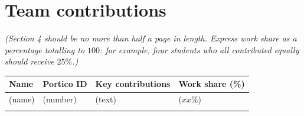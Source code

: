 \documentclass[12pt]{article}
\begin{document}
\section{Team contributions}
\emph{(Section 4 should be no more than half a page in length. Express work share as a percentage totalling to $100$: for example, four students who all contributed equally should receive $25\%$.)}


\vspace{1cm}

\begin{tabular}{|l|l|l|l|}
\hline
{\bf Name} & {\bf Portico ID} & {\bf Key contributions} & {\bf Work share (\%)} \\[1mm]
\hline
(name)    &  (number)  & (text) & ($xx\%$) \\\hline
          &            &         &          \\
\hline
\end{tabular}
\end{document}
